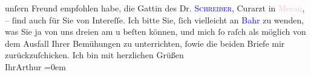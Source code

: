                    unſern Freund empfohlen habe, die Gattin des Dr. \textcolor{blue}{\textsc{Schreiber}}{}\ledrightnote{\textcolor{blue}{Joseph Schreiber}}, Curarzt in \textcolor{pink}{Meran}{}\ledrightnote{\textcolor{pink}{Meran}}, – ſind auch
                    für Sie von Intereſſe. Ich bitte Sie, ſich vielleicht an \textcolor{blue}{Bahr}{}\ledrightnote{\textcolor{blue}{Hermann Bahr}} zu wenden, was Sie ja von uns dreien am
                        \label{K_L00199_3v}\label{K_L00199_3h} u beſten können, {\pb}und mich ſo raſch als möglich von dem Ausfall
                    Ihrer Bemühungen zu unterrichten, ſowie die beiden Briefe mir
                    zurückzuſchicken.\pend
           \pstart
           Ich bin mit herzlichen Grüßen{\\[\baselineskip]}Ihr\spacefill\mbox{Arthur}\pend
           \leftskip=0em{}\endnumbering{}  
      
